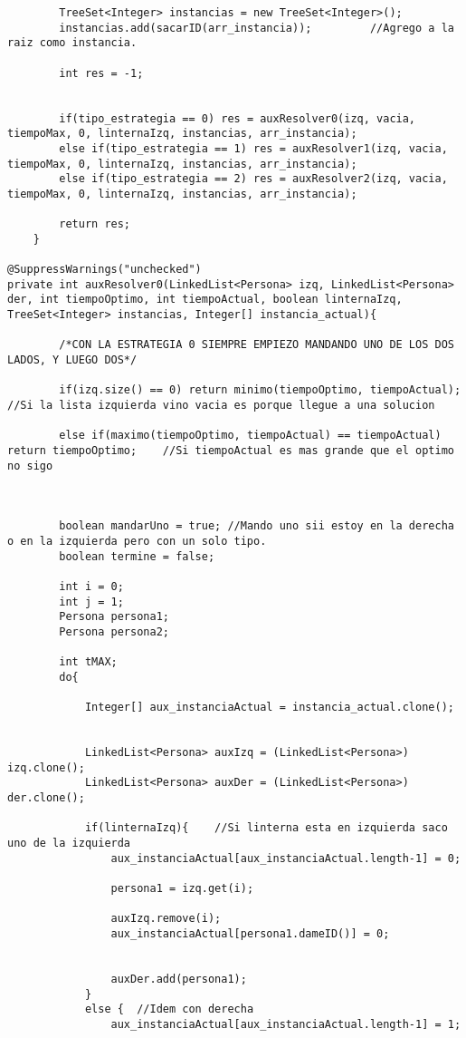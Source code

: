 \begin{lstlisting}
		TreeSet<Integer> instancias = new TreeSet<Integer>();
		instancias.add(sacarID(arr_instancia));			//Agrego a la raiz como instancia.
		
		int res = -1;

		
		if(tipo_estrategia == 0) res = auxResolver0(izq, vacia, tiempoMax, 0, linternaIzq, instancias, arr_instancia);
		else if(tipo_estrategia == 1) res = auxResolver1(izq, vacia, tiempoMax, 0, linternaIzq, instancias, arr_instancia);
		else if(tipo_estrategia == 2) res = auxResolver2(izq, vacia, tiempoMax, 0, linternaIzq, instancias, arr_instancia);
		
		return res;
	}

@SuppressWarnings("unchecked")
private int auxResolver0(LinkedList<Persona> izq, LinkedList<Persona> der, int tiempoOptimo, int tiempoActual, boolean linternaIzq, TreeSet<Integer> instancias, Integer[] instancia_actual){
		
		/*CON LA ESTRATEGIA 0 SIEMPRE EMPIEZO MANDANDO UNO DE LOS DOS LADOS, Y LUEGO DOS*/
		
		if(izq.size() == 0) return minimo(tiempoOptimo, tiempoActual);	//Si la lista izquierda vino vacia es porque llegue a una solucion

		else if(maximo(tiempoOptimo, tiempoActual) == tiempoActual) return tiempoOptimo;	//Si tiempoActual es mas grande que el optimo no sigo
		
		
		
		boolean mandarUno = true; //Mando uno sii estoy en la derecha o en la izquierda pero con un solo tipo.
		boolean termine = false;

		int i = 0;
		int j = 1;
		Persona persona1;
		Persona persona2;

		int tMAX;
		do{
			
			Integer[] aux_instanciaActual = instancia_actual.clone();					
			
			
			LinkedList<Persona> auxIzq = (LinkedList<Persona>) izq.clone();
			LinkedList<Persona> auxDer = (LinkedList<Persona>) der.clone();

			if(linternaIzq){	//Si linterna esta en izquierda saco uno de la izquierda
				aux_instanciaActual[aux_instanciaActual.length-1] = 0;
				
				persona1 = izq.get(i);

				auxIzq.remove(i);
				aux_instanciaActual[persona1.dameID()] = 0;
				
				
				auxDer.add(persona1);
			}
			else { 	//Idem con derecha
				aux_instanciaActual[aux_instanciaActual.length-1] = 1;


\end{lstlisting}
